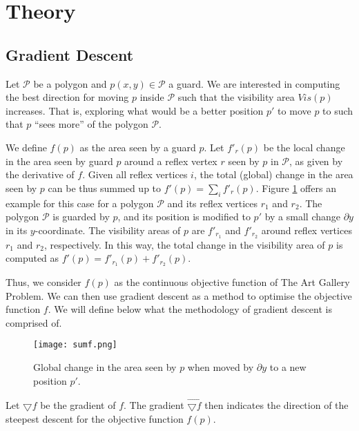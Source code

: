 \section{Theory}
\label{sec:theory}

\subsection{Gradient Descent}

Let $\mathcal P$ be a polygon and $p(x, y) \in \mathcal P$ a guard. We are interested in computing the best direction for moving $p$ inside $\mathcal P$ such that the visibility area $Vis(p)$ increases. That is, exploring what would be a better position $p'$ to move $p$ to such that $p$ ``sees more'' of the polygon $\mathcal P$. 

We define $f(p)$ as the area seen by a guard $p$. Let $f'_r(p)$ be the local change in the area seen by guard $p$ around a reflex vertex $r$ seen by $p$ in $\mathcal P$, as given by the derivative of $f$. Given all reflex vertices $i$, the total (global) change in the area seen by $p$ can be thus summed up to $f'(p) = \sum_i f'_r(p)$. Figure \ref{fig:sumf} offers an example for this case for a polygon $\mathcal P$ and its reflex vertices $r_1$ and $r_2$. The polygon $\mathcal P$ is guarded by $p$, and its position is modified to $p'$ by a small change $\partial y$ in its $y$-coordinate. The visibility areas of $p$ are $f'_{r_1}$ and $f'_{r_2}$ around reflex vertices $r_1$ and $r_2$, respectively. In this way, the total change in the visibility area of $p$ is computed as $f'(p) = f'_{r_1}(p) + f'_{r_2}(p)$.

Thus, we consider $f(p)$ as the continuous objective function of The Art Gallery Problem. We can then use gradient descent as a method to optimise the objective function $f$. We will define below what the methodology of gradient descent is comprised of.

\begin{figure}[h!]
    \centering
    \texttt{[image: sumf.png]}
    \caption{Global change in the area seen by $p$ when moved by $\partial y$ to a new position $p'$.}
    \label{fig:sumf}
\end{figure}


Let $\bigtriangledown f$ be the gradient of $f$. The gradient $\vec{\bigtriangledown f}$ then indicates the direction of the steepest descent for the objective function $f(p)$.

